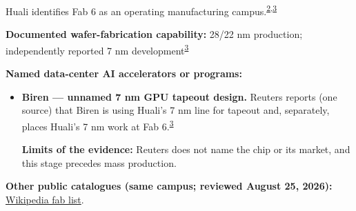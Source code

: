 \begin{minipage}[t][0.90\textheight][t]{\textwidth}
\begin{minipage}[t]{\textwidth}
\begin{minipage}[t]{0.32\textwidth}
\medskip
{\footnotesize Huali identifies Fab 6 as an operating manufacturing campus.\nobreak\textsuperscript{\href{\detokenize{https://www.hlmc.cn/aboutUs}}{\textcolor{accent}{2}},\href{\detokenize{https://www.investing.com/news/stock-market-news/exclusivechinas-no-2-chipmaker-readies-7-nm-production-as-beijing-ramps-up-selfsuffiency-drive-4561633}}{\textcolor{accent}{3}}}\par}
\medskip
{\footnotesize\textbf{Documented wafer-fabrication capability:} 28/22 nm production; independently reported 7 nm development\nobreak\textsuperscript{\href{\detokenize{https://www.investing.com/news/stock-market-news/exclusivechinas-no-2-chipmaker-readies-7-nm-production-as-beijing-ramps-up-selfsuffiency-drive-4561633}}{\textcolor{accent}{3}}}\par}
\end{minipage}
\end{minipage}
\par\vspace{0.65em}
\medskip
{\footnotesize\textbf{Named data-center AI accelerators or programs:}\par}
\begin{itemize}[leftmargin=1.25em,itemsep=0.35em,topsep=0.15em,parsep=0pt]
\item {\footnotesize\textbf{Biren --- unnamed 7 nm GPU tapeout design.} Reuters reports (one source) that Biren is using Huali's 7 nm line for tapeout and, separately, places Huali's 7 nm work at Fab 6.\nobreak\textsuperscript{\href{\detokenize{https://www.investing.com/news/stock-market-news/exclusivechinas-no-2-chipmaker-readies-7-nm-production-as-beijing-ramps-up-selfsuffiency-drive-4561633}}{\textcolor{accent}{3}}}\par {\scriptsize\color{black!62}\textbf{Limits of the evidence:} Reuters does not name the chip or its market, and this stage precedes mass production.\par}}
\end{itemize}
\smallskip
{\sffamily\scriptsize\color{black!62}\textbf{Other public catalogues (same campus; reviewed August 25, 2026):} \href{\detokenize{https://en.wikipedia.org/w/index.php?title=List_of_semiconductor_fabrication_plants&oldid=1370451124}\#\detokenize{Open_plants}}{Wikipedia fab list}.\par}
\medskip

\end{minipage}
